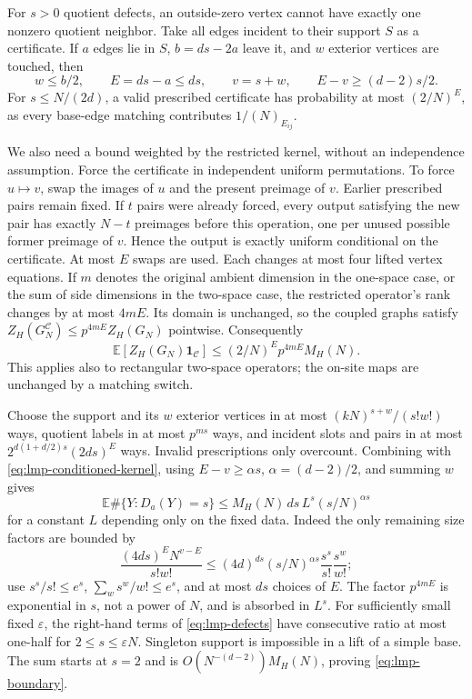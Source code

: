 For $s>0$ quotient defects, an outside-zero vertex cannot have exactly
one nonzero quotient neighbor. Take all edges incident to their
support $S$ as a certificate. If $a$ edges lie in $S$, $b=ds-2a$
leave it, and $w$ exterior vertices are touched, then
\[
 w\le b/2,\qquad E=ds-a\le ds,\qquad
 v=s+w,\qquad E-v\ge(d-2)s/2.
\]
For $s\le N/(2d)$, a valid prescribed certificate has probability
at most $(2/N)^E$, as every base-edge matching contributes
$1/(N)_{E_{ij}}$.

We also need a bound weighted by the restricted kernel, without an
independence assumption. Force the certificate in independent
uniform permutations. To force $u\mapsto v$, swap the images of $u$
and the present preimage of $v$. Earlier prescribed pairs remain
fixed. If $t$ pairs were already forced, every output satisfying the
new pair has exactly $N-t$ preimages before this operation, one per
unused possible former preimage of $v$. Hence the output is exactly
uniform conditional on the certificate. At most $E$ swaps are used.
Each changes at most four lifted vertex equations. If $m$ denotes
the original ambient dimension in the one-space case, or the sum of
side dimensions in the two-space case, the restricted operator's
rank changes by at most $4mE$. Its domain is unchanged, so
the coupled graphs satisfy
$Z_H(G_N^{\mathcal C})\le p^{4mE}Z_H(G_N)$ pointwise. Consequently
\begin{equation}\label{eq:lmp-conditioned-kernel}
 \mathbb E[Z_H(G_N)\mathbf1_{\mathcal C}]
       \le(2/N)^E p^{4mE}M_H(N).
\end{equation}
This applies also to rectangular two-space operators; the on-site
maps are unchanged by a matching switch.

Choose the support and its $w$ exterior vertices in at most
$(kN)^{s+w}/(s!w!)$ ways, quotient labels in at most $p^{ms}$ ways,
and incident slots and pairs in at most
$2^{d(1+d/2)s}(2ds)^E$ ways. Invalid prescriptions only overcount.
Combining with \eqref{eq:lmp-conditioned-kernel}, using
$E-v\ge\alpha s$, $\alpha=(d-2)/2$, and summing $w$ gives
\begin{equation}\label{eq:lmp-defects}
 \mathbb E\#\{Y:D_a(Y)=s\}
       \le M_H(N)\,ds\,L^s(s/N)^{\alpha s}
\end{equation}
for a constant $L$ depending only on the fixed data. Indeed the only
remaining size factors are bounded by
\[
 \frac{(4ds)^E N^{v-E}}{s!w!}
 \le(4d)^{ds}(s/N)^{\alpha s}\frac{s^s}{s!}\frac{s^w}{w!};
\]
use $s^s/s!\le e^s$, $\sum_w s^w/w!\le e^s$, and at most $ds$
choices of $E$. The factor $p^{4mE}$ is exponential in $s$, not a
power of $N$, and is absorbed in $L^s$.
For sufficiently small fixed $\varepsilon$, the right-hand terms
of \eqref{eq:lmp-defects} have consecutive ratio at most one-half
for $2\le s\le\varepsilon N$. Singleton support is impossible in
a lift of a simple base. The sum starts at $s=2$ and is
$O(N^{-(d-2)})M_H(N)$, proving \eqref{eq:lmp-boundary}.

